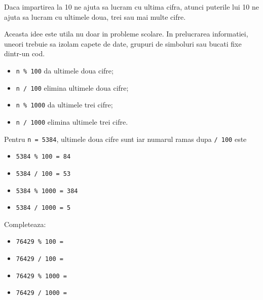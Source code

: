 
\begin{missionbox}
  Daca impartirea la 10 ne ajuta sa lucram cu ultima cifra, atunci puterile lui 10 ne ajuta sa lucram cu ultimele doua, trei sau mai multe cifre.

  Aceasta idee este utila nu doar in probleme scolare. In prelucrarea informatiei, uneori trebuie sa izolam capete de date, grupuri de simboluri sau bucati fixe dintr-un cod.
\end{missionbox}

\begin{conceptbox}[Generalizarea]
  \begin{itemize}
    \item \texttt{n \% 100} da ultimele doua cifre;
    \item \texttt{n / 100} elimina ultimele doua cifre;
    \item \texttt{n \% 1000} da ultimele trei cifre;
    \item \texttt{n / 1000} elimina ultimele trei cifre.
  \end{itemize}
\end{conceptbox}

\begin{guidebox}
  Pentru \texttt{n = 5384}, ultimele doua cifre sunt \hrulefill iar numarul ramas dupa \texttt{/ 100} este \hrulefill
\end{guidebox}

\newpage
{}

\begin{examplebox}
  \begin{itemize}
    \item \texttt{5384 \% 100 = 84}
    \item \texttt{5384 / 100 = 53}
    \item \texttt{5384 \% 1000 = 384}
    \item \texttt{5384 / 1000 = 5}
  \end{itemize}
\end{examplebox}

\begin{guidebox}
  Completeaza:
  \begin{itemize}
    \item \texttt{76429 \% 100 =} \hrulefill
    \item \texttt{76429 / 100 =} \hrulefill
    \item \texttt{76429 \% 1000 =} \hrulefill
    \item \texttt{76429 / 1000 =} \hrulefill
  \end{itemize}
\end{guidebox}

